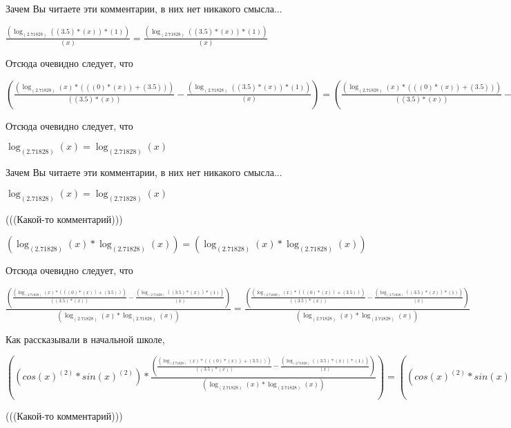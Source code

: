 \documentclass[12pt,a4paper,fleqn]{article}
\theoremstyle{definition}
\begin{document}
Зачем Вы читаете эти комментарии, в них нет никакого смысла...

$\frac{(\log_{( 2.71828 )}{(( 3.5 ) * ( x ))} * ( 1 ))}{( x )}
 = \frac{(\log_{( 2.71828 )}{(( 3.5 ) * ( x ))} * ( 1 ))}{( x )}
$

Отсюда очевидно следует, что

$(\frac{(\log_{( 2.71828 )}{( x )} * ((( 0 ) * ( x )) + ( 3.5 )))}{(( 3.5 ) * ( x ))}
 - \frac{(\log_{( 2.71828 )}{(( 3.5 ) * ( x ))} * ( 1 ))}{( x )}
) = (\frac{(\log_{( 2.71828 )}{( x )} * ((( 0 ) * ( x )) + ( 3.5 )))}{(( 3.5 ) * ( x ))}
 - \frac{(\log_{( 2.71828 )}{(( 3.5 ) * ( x ))} * ( 1 ))}{( x )}
)$

Отсюда очевидно следует, что

$\log_{( 2.71828 )}{( x )} = \log_{( 2.71828 )}{( x )}$

Зачем Вы читаете эти комментарии, в них нет никакого смысла...

$\log_{( 2.71828 )}{( x )} = \log_{( 2.71828 )}{( x )}$

(((Какой-то комментарий)))

$(\log_{( 2.71828 )}{( x )} * \log_{( 2.71828 )}{( x )}) = (\log_{( 2.71828 )}{( x )} * \log_{( 2.71828 )}{( x )})$

Отсюда очевидно следует, что

$\frac{(\frac{(\log_{( 2.71828 )}{( x )} * ((( 0 ) * ( x )) + ( 3.5 )))}{(( 3.5 ) * ( x ))}
 - \frac{(\log_{( 2.71828 )}{(( 3.5 ) * ( x ))} * ( 1 ))}{( x )}
)}{(\log_{( 2.71828 )}{( x )} * \log_{( 2.71828 )}{( x )})}
 = \frac{(\frac{(\log_{( 2.71828 )}{( x )} * ((( 0 ) * ( x )) + ( 3.5 )))}{(( 3.5 ) * ( x ))}
 - \frac{(\log_{( 2.71828 )}{(( 3.5 ) * ( x ))} * ( 1 ))}{( x )}
)}{(\log_{( 2.71828 )}{( x )} * \log_{( 2.71828 )}{( x )})}
$

Как рассказывали в начальной школе,

$((cos{( x )}^{( 2 )} * sin{( x )}^{( 2 )}) * \frac{(\frac{(\log_{( 2.71828 )}{( x )} * ((( 0 ) * ( x )) + ( 3.5 )))}{(( 3.5 ) * ( x ))}
 - \frac{(\log_{( 2.71828 )}{(( 3.5 ) * ( x ))} * ( 1 ))}{( x )}
)}{(\log_{( 2.71828 )}{( x )} * \log_{( 2.71828 )}{( x )})}
) = ((cos{( x )}^{( 2 )} * sin{( x )}^{( 2 )}) * \frac{(\frac{(\log_{( 2.71828 )}{( x )} * ((( 0 ) * ( x )) + ( 3.5 )))}{(( 3.5 ) * ( x ))}
 - \frac{(\log_{( 2.71828 )}{(( 3.5 ) * ( x ))} * ( 1 ))}{( x )}
)}{(\log_{( 2.71828 )}{( x )} * \log_{( 2.71828 )}{( x )})}
)$

(((Какой-то комментарий)))
\end{document}
